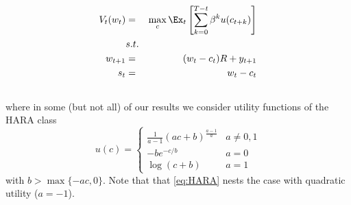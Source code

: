 \documentclass[titlepage]{\econtex}
\begin{document}
  \begin{eqnarray*}
    V_{t}(w_{t}) &=&
                     \max_{c} \Ex_{t}\left[\sum_{k=0}^{T-t}\beta^{k} u({c_{t+k}})\right]   \label{eq:valuefn} \\
                 & s.t. &  \nonumber
    \\              w_{t+1} & = & (w_{t}-c_{t})R+y_{t+1}  \\ 
    s_t &=& w_{t} - c_t \\
               \nonumber
  \end{eqnarray*}
  where in some (but not all) of our results we consider utility functions of the HARA class
  \begin{equation}\label{eq:HARA}
    u(c) = \begin{cases} \frac{1}{a - 1}\left(ac + b\right)^{\frac{a-1}{a}} & a \neq 0,1 \\
      -be^{-c/b} & a = 0 \\
      \log(c + b) & a = 1 \end{cases} \end{equation}
  with $b > \max\{- ac,0\}$. Note that that \eqref{eq:HARA} nests the case with quadratic utility ($a = -1$).
\end{document}
